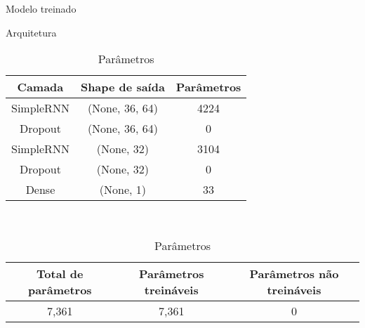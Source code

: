 
\begin{table}[ht]
	\centering
	\caption{Modelo treinado}\label{tbl:model}
	\begin{subtable}{\textwidth}
		\centering
		\caption{Arquitetura}\label{tbl:model_arq}
		\begin{tabular}{c c c}
			\hline
			Camada   &   Shape de saída    &   Parâmetros\\
			\hline
			\hline
			SimpleRNN&   (None, 36, 64)   &   4224      \\
			Dropout  &   (None, 36, 64)   &   0         \\
			SimpleRNN&   (None, 32)       &   3104      \\
			Dropout  &   (None, 32)       &   0         \\
			Dense    &   (None, 1)        &   33        \\
			\hline
		\end{tabular}
	\end{subtable}
	\\ \vspace{1cm}
	\begin{subtable}{\textwidth}
		\centering
		\caption{Parâmetros}\label{tbl:model_param}
		\begin{tabular}{c c c}
			\hline
			Total de parâmetros & Parâmetros treináveis & Parâmetros não treináveis \\
			\hline
			\hline
			7,361        &    7,361         & 0 \\
			\hline
		\end{tabular}
	\end{subtable}
\end{table}
